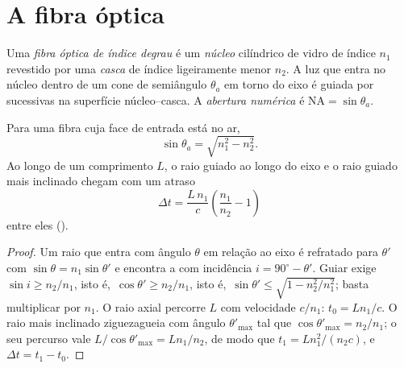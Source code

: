 \section{A fibra óptica}

\begin{definition}\label{def:b1:rays-reflection-refraction:fiber}
Uma \emph{fibra óptica de índice degrau} é um \emph{núcleo} cilíndrico de vidro de
índice $n_1$ revestido por uma \emph{casca} de índice ligeiramente menor $n_2$.
A luz que entra no núcleo dentro de um cone de semiângulo $\theta_a$ em torno
do eixo é guiada por  sucessivas na
superfície núcleo--casca. A \emph{abertura numérica} é
$\mathrm{NA} = \sin\theta_a$.
\end{definition}

\begin{proposition}\label{prop:b1:rays-reflection-refraction:fiber}
Para uma fibra cuja face de entrada está no ar,
\[
\sin\theta_a = \sqrt{n_1^2 - n_2^2} .
\]
Ao longo de um comprimento $L$, o raio guiado ao longo do eixo e o raio
guiado mais inclinado chegam com um atraso
\[
\Delta t = \frac{L\,n_1}{c}\left(\frac{n_1}{n_2} - 1\right)
\]
entre eles (\emph{}).
\end{proposition}

\begin{proof}
Um raio que entra com ângulo $\theta$ em relação ao eixo é refratado para $\theta'$
com $\sin\theta = n_1\sin\theta'$ e encontra a  com incidência
$i = 90^\circ - \theta'$. Guiar exige $\sin i \geq n_2/n_1$, isto é,\
$\cos\theta' \geq n_2/n_1$, isto é,\ $\sin\theta' \leq
\sqrt{1 - n_2^2/n_1^2}$; basta multiplicar por $n_1$. O raio axial percorre $L$ com
velocidade $c/n_1$: $t_0 = Ln_1/c$. O raio mais inclinado ziguezagueia com ângulo
$\theta'_{\max}$ tal que $\cos\theta'_{\max} = n_2/n_1$; o seu percurso vale
$L/\cos\theta'_{\max} = L n_1/n_2$, de modo que $t_1 = L n_1^2/(n_2 c)$, e
$\Delta t = t_1 - t_0$.
\end{proof}

